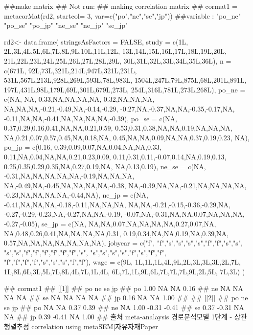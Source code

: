 \documentclass[a4paper]{book}
\begin{document}
\begin{Examples}
\begin{ExampleCode}
##make matrix
\#\# Not run: 
 ## making correlation matrix ##
cormat1 = metacorMat(rd2, startcol= 3, var=c("po","ne","se","jp"))
 ##variable : "po_ne" "po_se" "po_jp" "ne_se" "ne_jp" "se_jp"

rd2<- data.frame(
  stringsAsFactors = FALSE,
  study = c(1L,
            2L,3L,4L,5L,6L,7L,8L,9L,10L,11L,12L,
            13L,14L,15L,16L,17L,18L,19L,20L,
            21L,22L,23L,24L,25L,26L,27L,28L,29L,
            30L,31L,32L,33L,34L,35L,36L),
  n = c(671L,
        92L,73L,321L,214L,947L,321L,231L,
        531L,567L,213L,928L,269L,593L,78L,983L,
        1504L,247L,79L,875L,68L,201L,891L,
        197L,431L,98L,179L,69L,301L,679L,273L,
        254L,316L,781L,273L,268L),
  po_ne = c(NA,
            NA,-0.33,NA,NA,NA,NA,-0.32,NA,NA,NA,
            NA,NA,NA,-0.21,-0.49,NA,-0.14,-0.29,
            -0.27,NA,-0.37,NA,NA,-0.35,-0.17,NA,
            -0.11,NA,NA,-0.41,NA,NA,NA,NA,-0.39),
  po_se = c(NA,
            0.37,0.29,0.16,0.41,NA,NA,0.21,0.59,
            0.53,0.31,0.38,NA,NA,0.19,NA,NA,NA,
            NA,0.21,0.07,0.57,0.45,NA,0.18,NA,
            0.45,NA,NA,0.09,NA,NA,0.37,0.19,0.23,
            NA),
  po_jp = c(0.16,
            0.39,0.09,0.07,NA,0.04,NA,NA,0.33,
            0.11,NA,0.04,NA,NA,0.21,0.23,0.09,
            0.11,0.31,0.11,-0.07,0.14,NA,0.19,0.13,
            0.25,0.35,0.29,0.35,NA,0.27,0.19,NA,
            NA,0.13,0.19),
  ne_se = c(NA,
            -0.31,NA,NA,NA,NA,NA,-0.19,NA,NA,NA,
            NA,-0.49,NA,-0.45,NA,NA,NA,NA,-0.38,
            NA,-0.39,NA,NA,-0.21,NA,NA,NA,NA,
            -0.23,NA,NA,NA,NA,-0.44,NA),
  ne_jp = c(NA,
            -0.41,NA,NA,NA,-0.18,-0.11,NA,NA,NA,
            NA,NA,-0.21,-0.15,-0.36,-0.29,NA,
            -0.27,-0.29,-0.23,NA,-0.27,NA,NA,-0.19,
            -0.07,NA,-0.31,NA,NA,0.07,NA,NA,NA,
            -0.27,-0.05),
  se_jp = c(NA,
            NA,NA,0.07,NA,NA,NA,NA,0.27,0.07,NA,
            NA,0.48,0.26,0.41,NA,NA,NA,NA,0.31,
            0.19,0.34,NA,NA,0.19,NA,0.39,NA,
            0.57,NA,NA,NA,NA,NA,NA,NA),
  jobyear = c("f",
              "f","s","s","s","s","f","f","s","s",
              "s","s","f","f","f","f","f","f","s",
              "s","s","s","s","f","s","f","f",
              "f","f","f","f","s","s","s","f","f"),
  wage = c(9L,
           1L,1L,1L,4L,9L,2L,3L,3L,3L,2L,7L,
           1L,8L,6L,3L,5L,7L,8L,4L,7L,1L,4L,
           6L,7L,1L,9L,6L,7L,7L,7L,9L,2L,5L,
           7L,3L)
)

## cormat1
## [[1]]
## po ne se   jp
## po 1.00 NA NA 0.16
## ne   NA NA NA   NA
## se   NA NA NA   NA
## jp 0.16 NA NA 1.00
##
## [[2]]
## po    ne    se    jp
## po   NA    NA  0.37  0.39
## ne   NA  1.00 -0.31 -0.41
## se 0.37 -0.31    NA    NA
## jp 0.39 -0.41    NA  1.00
## 출처 meta-analaysis 경로분석모델 1단계 - 상관행렬추정 correlation using metaSEM|자유자재Paper


\end{ExampleCode}
\end{Examples}
\end{document}
